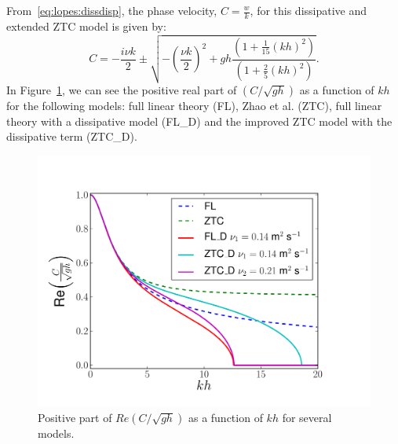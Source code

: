 From~\eqref{eq:lopes:dissdisp}, the phase velocity,
$\displaystyle C=\frac{w}{k}$, for this dissipative and extended
ZTC model is given by:
\begin{equation}\label{eq:lopes:phasevel}
C=-\frac{i\nu k}{2}\pm\sqrt{-\left(\frac{\nu
    k}{2}\right)^2+gh\frac{(1+\frac{1}{15}(kh)^2)}{(1+\frac{2}{5}(kh)^2)}}.
\end{equation}
In Figure~\ref{fig:lopes:dispersion}, we can see the positive
real part of $\displaystyle\left(C/\sqrt{gh}\right)$ as a
function of $kh$ for the following models: full linear
theory (FL), Zhao et al. (ZTC), full linear theory with a
dissipative model (FL\_D) and the improved ZTC model with
the dissipative term (ZTC\_D).
\begin{figure}
\begin{center}
\includegraphics[width=\largefig]{chapters/lopes/pdf/phase_velocity_simple.pdf}
\end{center}
\caption{Positive part of $\displaystyle
  Re\left(C/\sqrt{gh}\right)$ as a function of $kh$ for
  several models.}
\label{fig:lopes:dispersion}
\end{figure}

